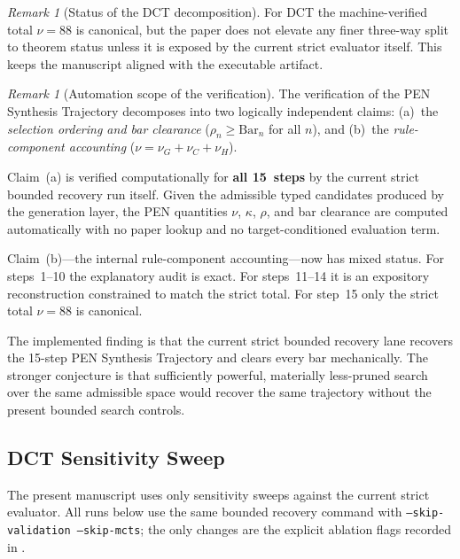 \documentclass[11pt,a4paper]{article}
\theoremstyle{plain}
\theoremstyle{definition}
\theoremstyle{remark}
\newtheorem{remark}[theorem]{Remark}
\begin{document}
\begin{remark}[Status of the DCT decomposition]
For DCT the machine-verified total $\nu = 88$ is canonical, but the paper does not elevate any finer three-way split to theorem status unless it is exposed by the current strict evaluator itself.
This keeps the manuscript aligned with the executable artifact.
\end{remark}

\begin{remark}[Automation scope of the verification]
\label{rem:automation-scope}
The verification of the PEN Synthesis Trajectory decomposes into two logically independent claims: (a)~the \emph{selection ordering and bar clearance} ($\rho_n \ge \mathrm{Bar}_n$ for all $n$), and (b)~the \emph{rule-component accounting} ($\nu = \nu_G + \nu_C + \nu_H$).

Claim~(a) is verified computationally for \textbf{all 15~steps} by the current strict bounded recovery run itself.
Given the admissible typed candidates produced by the generation layer, the PEN quantities $\nu$, $\kappa$, $\rho$, and bar clearance are computed automatically with no paper lookup and no target-conditioned evaluation term.

\noindent Claim~(b)---the internal rule-component accounting---now has mixed status.
For steps~1--10 the explanatory audit is exact.
For steps~11--14 it is an expository reconstruction constrained to match the strict total.
For step~15 only the strict total $\nu = 88$ is canonical.

The implemented finding is that the current strict bounded recovery lane recovers the 15-step PEN Synthesis Trajectory and clears every bar mechanically.
The stronger conjecture is that sufficiently powerful, materially less-pruned search over the same admissible space would recover the same trajectory without the present bounded search controls.
\end{remark}

\subsection{DCT Sensitivity Sweep}

The present manuscript uses only sensitivity sweeps against the current strict evaluator.
All runs below use the same bounded recovery command with \texttt{--skip-validation --skip-mcts}; the only changes are the explicit ablation flags recorded in .
\end{document}
